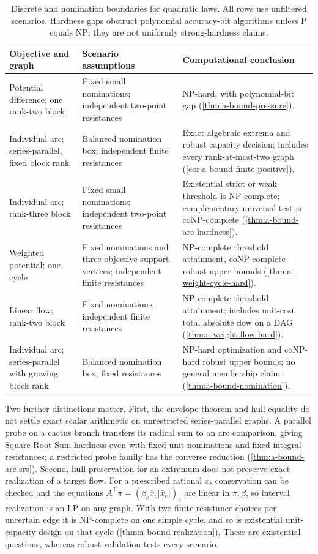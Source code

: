\begin{table}[tb]
\centering\small
\begin{tabularx}{\linewidth}{@{}P{.22\linewidth}P{.26\linewidth}Y@{}}
\toprule
Objective and graph & Scenario assumptions & Computational conclusion\\
\midrule
Potential difference; one rank-two block & Fixed small nominations;
independent two-point resistances & NP-hard, with polynomial-bit gap
(\cref{thm:a-bound-pressure}).\\[3pt]
Individual arc; series-parallel, fixed block rank & Balanced nomination
box; independent finite resistances & Exact algebraic extrema and robust
capacity decision; includes every rank-at-most-two graph
(\cref{cor:a-bound-finite-positive}).\\[3pt]
Individual arc; rank-three block & Fixed small nominations;
independent two-point resistances & Existential strict or weak threshold
is NP-complete; complementary universal test is coNP-complete
(\cref{thm:a-bound-arc-hardness}).\\[3pt]
Weighted potential; one cycle & Fixed nominations and three objective
support vertices; independent finite resistances & NP-complete threshold
attainment, coNP-complete robust upper bounds
(\cref{thm:a-weight-cycle-hard}).\\[3pt]
Linear flow; rank-two block & Fixed nominations; independent finite
resistances & NP-complete threshold attainment; includes unit-cost total
absolute flow on a DAG (\cref{thm:a-weight-flow-hard}).\\[3pt]
Individual arc; series-parallel with growing block rank & Balanced
nomination box; fixed resistances & NP-hard optimization and coNP-hard
robust upper bounds; no general membership claim
(\cref{thm:a-bound-nomination}).\\
\bottomrule
\end{tabularx}
\caption{Discrete and nomination boundaries for quadratic laws. All
rows use unfiltered scenarios. Hardness gaps obstruct polynomial
accuracy-bit algorithms unless P equals NP; they are not uniformly
strong-hardness claims.}
\label{tab:main-boundaries}
\end{table}

Two further distinctions matter. First, the envelope theorem and hull
equality do not settle exact scalar arithmetic on unrestricted
series-parallel graphs. A parallel probe on a cactus branch transfers its radical sum
to an arc comparison, giving Square-Root-Sum hardness even with fixed
unit nominations and fixed integral resistances; a restricted probe
family has the converse reduction (\cref{thm:a-bound-arc-srs}). Second,
hull preservation for an extremum does not preserve exact realization
of a target flow. For a prescribed rational $\bar x$, conservation can
be checked and the equations $A^\top\pi=(\beta_e\bar x_e|\bar x_e|)_e$
are linear in $\pi,\beta$, so interval realization is an LP on any
graph. With two finite resistance choices per uncertain edge it is
NP-complete on one simple cycle, and so is existential unit-capacity
design on that cycle (\cref{thm:a-bound-realization}). These are
existential questions, whereas robust validation tests every scenario.
